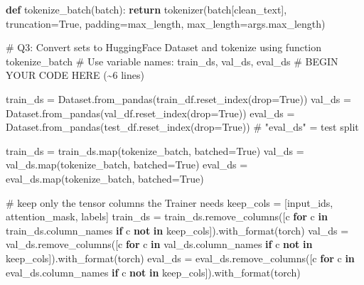\documentclass[
  letterpaper,
  DIV=11,
  numbers=noendperiod]{scrartcl}
\newenvironment{Shaded}{\begin{snugshade}}{\end{snugshade}}
\newcommand{\BuiltInTok}[1]{\textcolor[rgb]{0.00,0.23,0.31}{#1}}
\newcommand{\CommentTok}[1]{\textcolor[rgb]{0.37,0.37,0.37}{#1}}
\newcommand{\ControlFlowTok}[1]{\textcolor[rgb]{0.00,0.23,0.31}{\textbf{#1}}}
\newcommand{\KeywordTok}[1]{\textcolor[rgb]{0.00,0.23,0.31}{\textbf{#1}}}
\newcommand{\NormalTok}[1]{\textcolor[rgb]{0.00,0.23,0.31}{#1}}
\newcommand{\OperatorTok}[1]{\textcolor[rgb]{0.37,0.37,0.37}{#1}}
\newcommand{\RegionMarkerTok}[1]{\textcolor[rgb]{0.00,0.23,0.31}{#1}}
\newcommand{\StringTok}[1]{\textcolor[rgb]{0.13,0.47,0.30}{#1}}
\newcommand{\VariableTok}[1]{\textcolor[rgb]{0.07,0.07,0.07}{#1}}
\begin{document}
\begin{Shaded}
\begin{Highlighting}[]
    \KeywordTok{def}\NormalTok{ tokenize\_batch(batch):}
        \ControlFlowTok{return}\NormalTok{ tokenizer(batch[}\StringTok{\textquotesingle{}clean\_text\textquotesingle{}}\NormalTok{], truncation}\OperatorTok{=}\VariableTok{True}\NormalTok{, padding}\OperatorTok{=}\StringTok{\textquotesingle{}max\_length\textquotesingle{}}\NormalTok{, max\_length}\OperatorTok{=}\NormalTok{args.max\_length)}

    \CommentTok{\# Q3: Convert sets to HuggingFace Dataset and tokenize using function tokenize\_batch}
    \CommentTok{\# Use variable names: train\_ds, val\_ds, eval\_ds}
    \CommentTok{\# }\RegionMarkerTok{BEGIN}\CommentTok{ YOUR CODE HERE (\textasciitilde{}6 lines)}

\NormalTok{    train\_ds }\OperatorTok{=}\NormalTok{ Dataset.from\_pandas(train\_df.reset\_index(drop}\OperatorTok{=}\VariableTok{True}\NormalTok{))}
\NormalTok{    val\_ds   }\OperatorTok{=}\NormalTok{ Dataset.from\_pandas(val\_df.reset\_index(drop}\OperatorTok{=}\VariableTok{True}\NormalTok{))}
\NormalTok{    eval\_ds  }\OperatorTok{=}\NormalTok{ Dataset.from\_pandas(test\_df.reset\_index(drop}\OperatorTok{=}\VariableTok{True}\NormalTok{))  }\CommentTok{\# "eval\_ds" = test split}

\NormalTok{    train\_ds }\OperatorTok{=}\NormalTok{ train\_ds.}\BuiltInTok{map}\NormalTok{(tokenize\_batch, batched}\OperatorTok{=}\VariableTok{True}\NormalTok{)}
\NormalTok{    val\_ds   }\OperatorTok{=}\NormalTok{ val\_ds.}\BuiltInTok{map}\NormalTok{(tokenize\_batch, batched}\OperatorTok{=}\VariableTok{True}\NormalTok{)}
\NormalTok{    eval\_ds  }\OperatorTok{=}\NormalTok{ eval\_ds.}\BuiltInTok{map}\NormalTok{(tokenize\_batch, batched}\OperatorTok{=}\VariableTok{True}\NormalTok{)}

    \CommentTok{\# keep only the tensor columns the Trainer needs}
\NormalTok{    keep\_cols }\OperatorTok{=}\NormalTok{ [}\StringTok{\textquotesingle{}input\_ids\textquotesingle{}}\NormalTok{, }\StringTok{\textquotesingle{}attention\_mask\textquotesingle{}}\NormalTok{, }\StringTok{\textquotesingle{}labels\textquotesingle{}}\NormalTok{]}
\NormalTok{    train\_ds }\OperatorTok{=}\NormalTok{ train\_ds.remove\_columns([c }\ControlFlowTok{for}\NormalTok{ c }\KeywordTok{in}\NormalTok{ train\_ds.column\_names }\ControlFlowTok{if}\NormalTok{ c }\KeywordTok{not} \KeywordTok{in}\NormalTok{ keep\_cols]).with\_format(}\StringTok{\textquotesingle{}torch\textquotesingle{}}\NormalTok{)}
\NormalTok{    val\_ds   }\OperatorTok{=}\NormalTok{ val\_ds.remove\_columns([c }\ControlFlowTok{for}\NormalTok{ c }\KeywordTok{in}\NormalTok{ val\_ds.column\_names }\ControlFlowTok{if}\NormalTok{ c }\KeywordTok{not} \KeywordTok{in}\NormalTok{ keep\_cols]).with\_format(}\StringTok{\textquotesingle{}torch\textquotesingle{}}\NormalTok{)}
\NormalTok{    eval\_ds  }\OperatorTok{=}\NormalTok{ eval\_ds.remove\_columns([c }\ControlFlowTok{for}\NormalTok{ c }\KeywordTok{in}\NormalTok{ eval\_ds.column\_names }\ControlFlowTok{if}\NormalTok{ c }\KeywordTok{not} \KeywordTok{in}\NormalTok{ keep\_cols]).with\_format(}\StringTok{\textquotesingle{}torch\textquotesingle{}}\NormalTok{)}




\end{Highlighting}
\end{Shaded}
\end{document}
